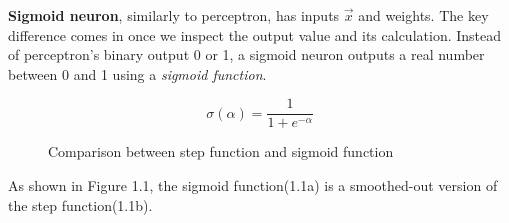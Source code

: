 \textbf{Sigmoid neuron}, similarly to perceptron, has inputs $\vec{x}$ and weights. The key difference comes in once we inspect the output value and its calculation. Instead of perceptron's binary output 0 or 1, a sigmoid neuron outputs a real number between 0 and 1 using a \textit{sigmoid function}.\cite{nndl2015michaelnielsen}\cite{rojas2013neural}\cite{matous}

\begin{equation}
    {\sigma(\alpha) = \frac{1}{1 + e^{-\alpha}}}
\end{equation}

\begin{figure}[h]
	\centering
    \qquad
    \caption{Comparison between step function and sigmoid function}
\end{figure}
As shown in Figure 1.1, the sigmoid function(1.1a) is a smoothed-out version of the step function(1.1b).
